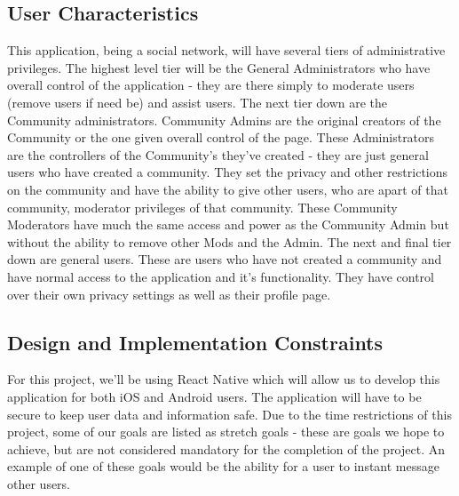 \documentclass[letterpaper, 10, draftclsnofoot, onecolumn]{IEEEtran}
\begin{document}

\subsection{User Characteristics}
This application, being a social network, will have several tiers of administrative privileges. The highest level tier will be the General Administrators who have overall control of the application - they are there simply to moderate users (remove users if need be) and assist users. The next tier down are the Community administrators. Community Admins are the original creators of the Community or the one given overall control of the page. These Administrators are the controllers of the Community's they've created - they are just general users who have created a community. They set the privacy and other restrictions on the community and have the ability to give other users, who are apart of that community, moderator privileges of that community. These Community Moderators have much the same access and power as the Community Admin but without the ability to remove other Mods and the Admin. The next and final tier down are general users. These are users who have not created a community and have normal access to the application and it's functionality. They have control over their own privacy settings as well as their profile page. 

\subsection{Design and Implementation Constraints}
For this project, we'll be using React Native which will allow us to develop this application for both iOS and Android users. The application will have to be secure to keep user data and information safe. Due to the time restrictions of this project, some of our goals are listed as stretch goals - these are goals we hope to achieve, but are not considered mandatory for the completion of the project. An example of one of these goals would be the ability for a user to instant message other users. 
\end{document}
